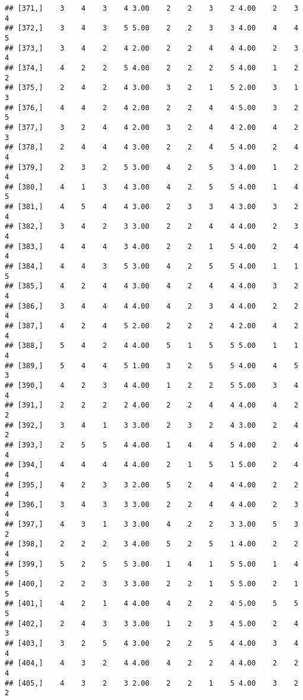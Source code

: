 \documentclass[]{article}
\begin{document}
\begin{verbatim}
## [371,]    3    4    3    4 3.00    2    2    3    2 4.00    2    3    4
## [372,]    3    4    3    5 5.00    2    2    3    3 4.00    4    4    5
## [373,]    3    4    2    4 2.00    2    2    4    4 4.00    2    3    4
## [374,]    4    2    2    5 4.00    2    2    2    5 4.00    1    2    2
## [375,]    2    4    2    4 3.00    3    2    1    5 2.00    3    1    3
## [376,]    4    4    2    4 2.00    2    2    4    4 5.00    3    2    5
## [377,]    3    2    4    4 2.00    3    2    4    4 2.00    4    2    3
## [378,]    2    4    4    4 3.00    2    2    4    5 4.00    2    4    4
## [379,]    2    3    2    5 3.00    4    2    5    3 4.00    1    2    4
## [380,]    4    1    3    4 3.00    4    2    5    5 4.00    1    4    5
## [381,]    4    5    4    4 3.00    2    3    3    4 3.00    3    2    4
## [382,]    3    4    2    3 3.00    2    2    4    4 4.00    2    3    4
## [383,]    4    4    4    3 4.00    2    2    1    5 4.00    2    4    4
## [384,]    4    4    3    5 3.00    4    2    5    5 4.00    1    1    5
## [385,]    4    2    4    4 3.00    4    2    4    4 4.00    3    2    4
## [386,]    3    4    4    4 4.00    4    2    3    4 4.00    2    2    4
## [387,]    4    2    4    5 2.00    2    2    2    4 2.00    4    2    4
## [388,]    5    4    2    4 4.00    5    1    5    5 5.00    1    1    4
## [389,]    5    4    4    5 1.00    3    2    5    5 4.00    4    5    3
## [390,]    4    2    3    4 4.00    1    2    2    5 5.00    3    4    4
## [391,]    2    2    2    2 4.00    2    2    4    4 4.00    4    2    2
## [392,]    3    4    1    3 3.00    2    3    2    4 3.00    2    4    2
## [393,]    2    5    5    4 4.00    1    4    4    5 4.00    2    4    4
## [394,]    4    4    4    4 4.00    2    1    5    1 5.00    2    4    4
## [395,]    4    2    3    3 2.00    5    2    4    4 4.00    2    2    4
## [396,]    3    4    3    3 3.00    2    2    4    4 4.00    2    3    4
## [397,]    4    3    1    3 3.00    4    2    2    3 3.00    5    3    2
## [398,]    2    2    2    3 4.00    5    2    5    1 4.00    2    2    4
## [399,]    5    2    5    5 3.00    1    4    1    5 5.00    1    4    5
## [400,]    2    2    3    3 3.00    2    2    1    5 5.00    2    1    5
## [401,]    4    2    1    4 4.00    4    2    2    4 5.00    5    5    5
## [402,]    2    4    3    3 3.00    1    2    3    4 5.00    2    4    3
## [403,]    3    2    5    4 3.00    2    2    5    4 4.00    3    4    4
## [404,]    4    3    2    4 4.00    4    2    2    4 4.00    2    2    4
## [405,]    4    3    2    3 2.00    2    2    1    5 4.00    3    2    2

\end{verbatim}
\end{document}
